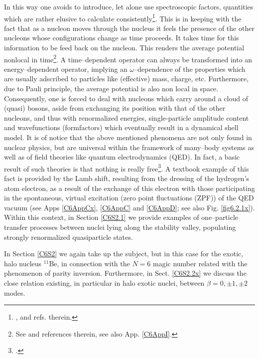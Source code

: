 In this way one avoids to introduce, let alone use spectroscopic factors, quantities which are rather elusive to calculate consistently\footnote{ \cite{Duguet:12,Jenning:11,Dickhoff:04,Dickhoff:05}, and refs. therein.}. This is in keeping with the fact that as a nucleon moves through the nucleus it feels the presence of the other nucleons whose configurations change as time proceeds. It takes time for this information to be feed back on the nucleon. This renders the average potential nonlocal in time\footnote{See \citet{Mahaux:85} and references therein, see also App. \ref{C6AppI}.}. A time--dependent operator can always be transformed into an energy--dependent operator, implying an $\omega$--dependence of the properties which are usually adscribed to particles like (effective) mass, charge, etc. Furthermore, due to  Pauli principle, the average potential is also non local in space.  Consequently, one is forced to deal with nucleons which carry around a cloud of (quasi) bosons, aside from  exchanging its position with that of the other nucleons, and thus with renormalized energies, single-particle amplitude content and wavefunctions (formfactors) which eventually result in a dynamical shell model.  It is of notice that the above mentioned phenomena are not only found in nuclear physics, but are universal within the framework of many--body systems as well as of field theories like quantum electrodynamics (QED). In fact, a basic result of such theories is that nothing is really free\footnote{\cite{Feynman:75}.}. A textbook example of this fact is provided by the Lamb shift, resulting from the dressing of the hydrogen's atom electron, as a result of the exchange of this electron with those participating in the spontaneous, virtual excitation (zero point fluctuations (ZPF)) of the QED vacuum (see Apps \ref{C6AppCx}, \ref{C6AppC} and \ref{C6AppD}; see also Fig. \ref{fig6.2.1x}).  Within this context, in Section \ref{C6S2.1} we provide examples of one--particle transfer processes between nuclei lying along the stability valley, populating strongly renormalized quasiparticle states.


In Section \ref{C6S2}  we again take up the subject, but in this case for the exotic, halo nucleus $^{11}$Be, in connection with the $N=6$ magic number related with the   phenomenon of parity inversion. Furthermore, in Sect. \ref{C6S2.2x} we discuss the close relation existing, in particular in halo exotic nuclei, between $\beta=0,\pm1,\pm2$ modes. 


